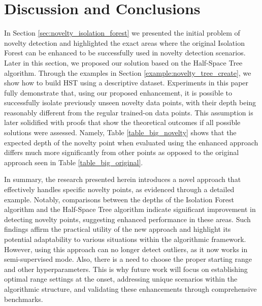 \section{Discussion and Conclusions}
\label{sec:conclusion}
In Section \ref{sec:novelty_isolation_forest} we presented the initial problem of novelty detection and highlighted the exact areas where the original Isolation Forest can be enhanced to be successfully used in novelty detection scenarios.
Later in this section, we proposed our solution based on the Half-Space Tree algorithm.
Through the examples in Section \ref{example:novelty_tree_create}, we show how to build HST using a descriptive dataset.
Experiments in this paper fully demonstrate that, using our proposed enhancement, it is possible to successfully isolate previously unseen novelty data points, with their depth being reasonably different from the regular trained-on data points.
This assumption is later solidified with proofs that show the theoretical outcomes if all possible solutions were assessed. Namely, Table \ref{table_big_novelty} shows that the expected depth of the novelty point when evaluated using the enhanced approach differs much more significantly from other points as opposed to the original approach seen in Table \ref{table_big_original}.

In summary, the research presented herein introduces a novel approach that effectively handles specific novelty points, as evidenced through a detailed example.
Notably, comparisons between the depths of the Isolation Forest algorithm and the Half-Space Tree algorithm indicate significant improvement in detecting novelty points, suggesting enhanced performance in these areas.
Such findings affirm the practical utility of the new approach and highlight its potential adaptability to various situations within the algorithmic framework. 
However, using this approach can no longer detect outliers, as it now works in semi-supervised mode. 
Also, there is a need to choose the proper starting range and other hyperparameters. 
This is why future work will focus on establishing optimal range settings at the onset, addressing unique scenarios within the algorithmic structure, and validating these enhancements through comprehensive benchmarks.
